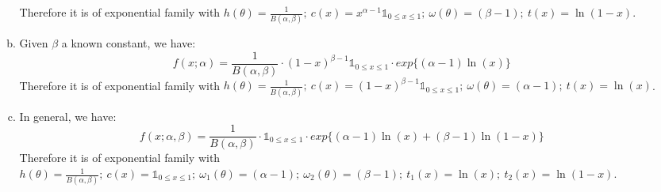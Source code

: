 \documentclass[12pt]{article}
\begin{document}
\begin{enumerate}
\begin{enumerate}[(a)]
        Therefore it is of exponential family with $h(\theta)=\frac{1}{B(\alpha,\beta)};\ c(x)=x^{\alpha -1} \mathds{1}_{0\le x \le1};\ \omega(\theta)=(\beta-1);\ t(x)=\ln(1-x)$.
        \item
        Given $\beta$ a known constant, we have:
        $$f(x;\alpha) = \frac{1}{B(\alpha,\beta)} \cdot (1-x)^{\beta -1} \mathds{1}_{0\le x \le1} \cdot exp\{(\alpha-1)\ln(x)\}$$
        Therefore it is of exponential family with $h(\theta)=\frac{1}{B(\alpha,\beta)};\ c(x)=(1-x)^{\beta -1} \mathds{1}_{0\le x \le1};\ \omega(\theta)=(\alpha-1);\ t(x)=\ln(x)$.
        \item
        In general, we have:
        $$f(x;\alpha,\beta) = \frac{1}{B(\alpha,\beta)} \cdot \mathds{1}_{0\le x \le1} \cdot exp\{(\alpha-1)\ln(x) + (\beta-1)\ln(1-x)\}$$
        Therefore it is of exponential family with $h(\theta)=\frac{1}{B(\alpha,\beta)};\ c(x)=\mathds{1}_{0\le x \le1};\ \omega_1(\theta)=(\alpha-1);\ \omega_2(\theta)=(\beta-1);\ t_1(x)=\ln(x);\ t_2(x)=\ln(1-x)$.
    \end{enumerate}
\end{enumerate}
\end{document}
